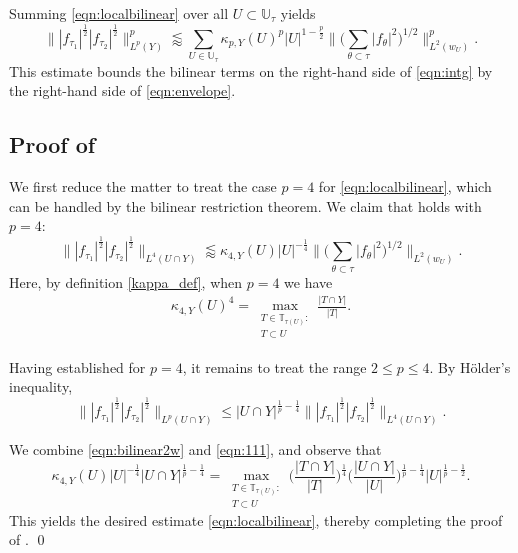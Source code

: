 \documentclass[11pt]{amsart}
\theoremstyle{definition}
\theoremstyle{remark}
\newcommand{\T}{\mathbb{T}}
\newcommand{\U}{\mathbb{U}}
\newcommand{\less}{\lessapprox}
\begin{document}
Summing \eqref{eqn:localbilinear} over all $U\subset \mathbb U_\tau$ yields
\[ 
   \big\| |f_{\tau_1}|^{\frac12} |f_{\tau_2}|^{\frac12}\big\|_{L^p(Y)}^p  \less \sum_{U\in \U_{\tau}} \kappa_{p,Y}(U)^p |U|^{1-\frac{p}{2}} \big\| \big(\sum_{\theta \subset \tau} |f_{\theta}|^2 \big)^{1/2}  \big\|_{L^2(w_{U})}^p.
\]
This estimate bounds the bilinear terms on the right-hand side of \eqref{eqn:intg} by the right-hand side of \eqref{eqn:envelope}.


\subsection{Proof of }
We first reduce the matter to treat the case $p=4$ for \eqref{eqn:localbilinear}, which can be handled by the bilinear restriction theorem.
We claim that  holds with $p=4$:
\begin{equation}\label{eqn:bilinear2w}
	\big\| |f_{\tau_1}|^{\frac12} |f_{\tau_2}|^{\frac12}\big\|_{L^4(U\cap Y)}  \less
	\kappa_{4,Y}(U) |U|^{-\frac14} \big\| \big(\sum_{\theta \subset \tau} |f_{\theta}|^2 \big)^{1/2}  \big\|_{L^2(w_{U})}.
\end{equation}
Here, by definition \eqref{kappa_def}, when $p=4$ we have
\begin{align}\label{k4}
\kappa_{4,Y}(U)^4=
\max_{\substack{T \in \T_{\tau(U)}:\\ T\subset U}} \frac{|T\cap Y|}{|T|}.
\end{align}


Having established  for $p=4$,
it remains to treat the range $2\le p\le 4$.
By H\"older's inequality,
\begin{equation}\label{eqn:111}
       \big\| |f_{\tau_1}|^{\frac12} |f_{\tau_2}|^{\frac12}\big\|_{L^p(U\cap Y)}
       \le |U\cap Y|^{\frac1p-\frac14} \big\| |f_{\tau_1}|^{\frac12} |f_{\tau_2}|^{\frac12}\big\|_{L^4(U\cap Y)}.
\end{equation}

We combine \eqref{eqn:bilinear2w} and \eqref{eqn:111}, and observe that
\[
\kappa_{4,Y}(U)|U|^{-\frac14}|U\cap Y|^{\frac1p-\frac14}=\max_{\substack{T \in \T_{\tau(U)}:\\ T\subset U}} \Big(\frac{|T\cap Y|}{|T|}\Big)^{\frac14}\Big(\frac{|U\cap Y|}{|U|}\Big)^{\frac1p-\frac14}|U|^{\frac1p-\frac12}.
\]
This yields the desired estimate \eqref{eqn:localbilinear}, thereby completing the proof of . \qed
\end{document}
